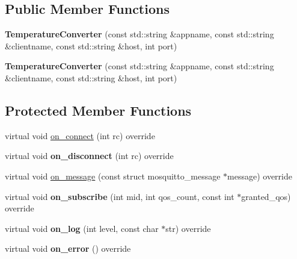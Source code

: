 \subsection*{Public Member Functions}
\begin{DoxyCompactItemize}
\item 
{\bfseries Temperature\+Converter} (const std\+::string \&appname, const std\+::string \&clientname, const std\+::string \&host, int port)\hypertarget{class_temperature_converter_ad34b42abb624d7d4184f6e47dc1ad200}{}\label{class_temperature_converter_ad34b42abb624d7d4184f6e47dc1ad200}

\item 
{\bfseries Temperature\+Converter} (const std\+::string \&appname, const std\+::string \&clientname, const std\+::string \&host, int port)\hypertarget{class_temperature_converter_ad34b42abb624d7d4184f6e47dc1ad200}{}\label{class_temperature_converter_ad34b42abb624d7d4184f6e47dc1ad200}

\end{DoxyCompactItemize}
\subsection*{Protected Member Functions}
\begin{DoxyCompactItemize}
\item 
virtual void \hyperlink{class_temperature_converter_a2873aa81d1480326e797333649ad7612}{on\+\_\+connect} (int rc) override
\item 
virtual void {\bfseries on\+\_\+disconnect} (int rc) override\hypertarget{class_temperature_converter_aed2c87d3bea3cdc71b16932a5deb685a}{}\label{class_temperature_converter_aed2c87d3bea3cdc71b16932a5deb685a}

\item 
virtual void \hyperlink{class_temperature_converter_abe798ee6c4861d708fdbf845682a55f4}{on\+\_\+message} (const struct mosquitto\+\_\+message $\ast$message) override
\item 
virtual void {\bfseries on\+\_\+subscribe} (int mid, int qos\+\_\+count, const int $\ast$granted\+\_\+qos) override\hypertarget{class_temperature_converter_a19e82377ed204cd11e63df20368c7c07}{}\label{class_temperature_converter_a19e82377ed204cd11e63df20368c7c07}

\item 
virtual void {\bfseries on\+\_\+log} (int level, const char $\ast$str) override\hypertarget{class_temperature_converter_a570e3818402e2bbba5d5ecb6529423f3}{}\label{class_temperature_converter_a570e3818402e2bbba5d5ecb6529423f3}

\item 
virtual void {\bfseries on\+\_\+error} () override\hypertarget{class_temperature_converter_ac7fc38707aea9dc09145de054c89ffd1}{}\label{class_temperature_converter_ac7fc38707aea9dc09145de054c89ffd1}

\end{DoxyCompactItemize}
